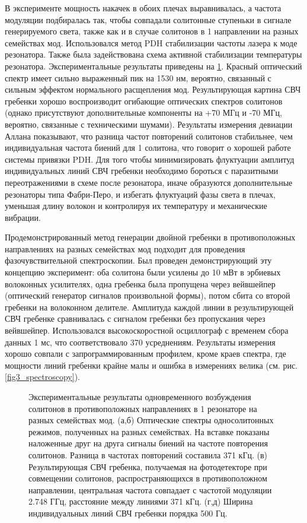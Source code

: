 В эксперименте мощность накачек в обоих плечах выравнивалась, а частота модуляции подбиралась так, чтобы совпадали солитонные ступеньки в сигнале генерируемого света, также как и в случае солитонов в 1 направлении на разных семействах мод. Использовался метод PDH стабилизации частоты лазера к моде резонатора. Также была задействована схема активной стабилизации температуры резонатора. Экспериментальные результаты приведены на \ref{counter_prop_results}. Красный оптический спектр имеет сильно выраженный пик на 1530 нм, вероятно, связанный с сильным эффектом нормального расщепления мод. Результирующая картина СВЧ гребенки хорошо воспроизводит огибающие оптических спектров солитонов (однако присутствуют дополнительные компоненты на +70 МГц и -70 МГц, вероятно, связанные с техническими шумами). Результаты измерения девиации Аллана показывают, что разница частот повторений солитонов стабильнее, чем индивидуальная частота биений для 1 солитона, что говорит о хорошей работе системы привязки PDH. Для того чтобы минимизировать флуктуации амплитуд индивидуальных линий СВЧ гребенки необходимо бороться с паразитными переотражениями в схеме после резонатора, иначе образуются дополнительные резонаторы типа Фабри-Перо, и избегать флуктуаций фазы света в плечах, уменьшая длину волокон и контролируя их температуру и механические вибрации.

Продемонстрированный метод генерации двойной гребенки в противоположных направлениях на разных семействах мод подходит для проведения фазочувствительной спектроскопии. Был проведен демонстрирующий эту концепцию эксперимент: оба солитона были усилены до 10 мВт в эрбиевых волоконных усилителях, одна гребенка была пропущена через вейвшейпер (оптический генератор сигналов произвольной формы), потом сбита со второй гребенки на волоконном делителе. Амплитуда каждой линии в результирующей СВЧ гребенке сравнивалась с сигналом гребенки без пропускания через вейвшейпер. Использовался высокоскоростной осциллограф с временем сбора данных 1 мс, что соответствовало 370 усреднениям. Результаты измерения хорошо совпали с запрограммированным профилем, кроме краев спектра, где мощности линий гребенки крайне малы и ошибка в измерениях велика (см. рис. \ref{fig3_spectroscopy}).

\begin{figure}[!htb]
\begin{minipage}{1\linewidth}
\end{minipage}
\caption{Экспериментальные результаты одновременного возбуждения солитонов в противоположных направлениях в 1 резонаторе на разных семействах мод. (а,б) Оптические спектры односолитонных режимов, полученных на разных семействах. На вставке показаны наложенные друг на друга сигналы биений на частоте повторения солитонов. Разница в частотах повторений составила 371 кГц. (в) Результирующая СВЧ гребенка, получаемая на фотодетекторе при совмещении солитонов, распространяющихся в противоположном направлении, центральная частота совпадает с частотой модуляции 2.748 ГГц, расстояние между линиями 371 кГц. (г,д) Ширина индивидуальных линий СВЧ гребенки порядка 500 Гц.}
\label{counter_prop_results}
\end{figure}

